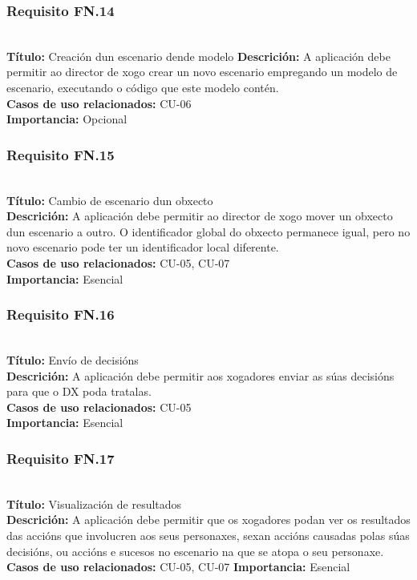 \subsubsection{Requisito FN.14}~\\
{\bf Título:} Creación dun escenario dende modelo
{\bf Descrición:} A aplicación debe permitir ao director de xogo crear un novo
escenario empregando un modelo de escenario, executando o código que este modelo contén.\\
{\bf Casos de uso relacionados:} CU-06\\
{\bf Importancia:} Opcional

\subsubsection{Requisito FN.15}~\\
{\bf Título:} Cambio de escenario dun obxecto\\
{\bf Descrición:} A aplicación debe permitir ao director de xogo mover un
obxecto dun escenario a outro. O identificador global do obxecto permanece
igual, pero no novo escenario pode ter un identificador local diferente.\\
{\bf Casos de uso relacionados:} CU-05, CU-07\\
{\bf Importancia:} Esencial

\subsubsection{Requisito FN.16}~\\
{\bf Título:} Envío de decisións\\
{\bf Descrición:} A aplicación debe permitir aos xogadores enviar as súas
decisións para que o DX poda tratalas.\\
{\bf Casos de uso relacionados:} CU-05\\
{\bf Importancia:} Esencial

\subsubsection{Requisito FN.17}~\\
{\bf Título:} Visualización de resultados\\
{\bf Descrición:} A aplicación debe permitir que os xogadores podan ver os
resultados das accións que involucren aos seus personaxes, sexan accións
causadas polas súas decisións, ou accións e sucesos no escenario na que se atopa
o seu personaxe.
{\bf Casos de uso relacionados:} CU-05, CU-07
{\bf Importancia:} Esencial



